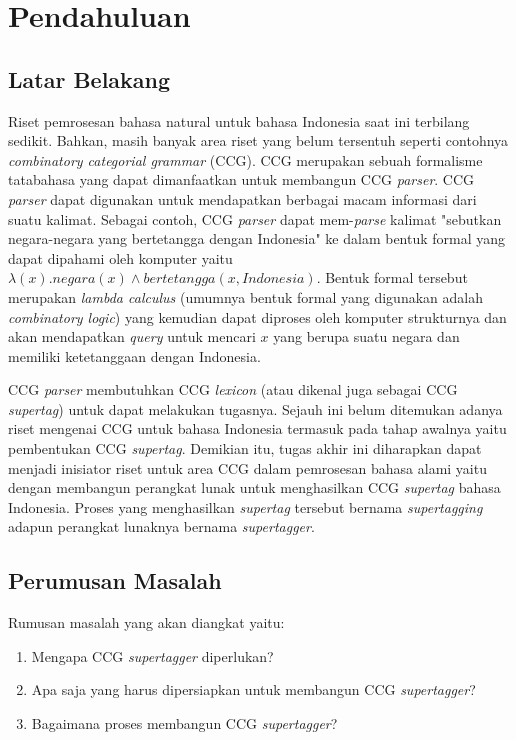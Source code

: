 \chapter{Pendahuluan}
\section{Latar Belakang}

Riset pemrosesan bahasa natural untuk bahasa Indonesia saat ini terbilang sedikit.
Bahkan, masih banyak area riset yang belum tersentuh seperti contohnya
\textit{combinatory categorial grammar} (CCG).
CCG merupakan sebuah formalisme tatabahasa yang dapat dimanfaatkan untuk membangun CCG \textit{parser}.
CCG \textit{parser} dapat digunakan untuk mendapatkan berbagai macam informasi dari suatu kalimat.
Sebagai contoh, CCG \textit{parser} dapat mem-\textit{parse} kalimat
"sebutkan negara-negara yang bertetangga dengan Indonesia" ke dalam bentuk formal yang dapat dipahami
oleh komputer yaitu $\lambda{(x). negara(x) \land bertetangga(x, Indonesia)}$.
Bentuk formal tersebut merupakan \textit{lambda calculus}
(umumnya bentuk formal yang digunakan adalah \textit{combinatory logic}) yang kemudian dapat diproses
oleh komputer strukturnya dan akan mendapatkan \textit{query} untuk mencari $x$ yang berupa
suatu negara dan memiliki ketetanggaan dengan Indonesia.

CCG \textit{parser} membutuhkan CCG \textit{lexicon} (atau dikenal juga sebagai CCG \textit{supertag})
untuk dapat melakukan tugasnya. Sejauh ini belum ditemukan adanya riset mengenai CCG untuk
bahasa Indonesia termasuk pada tahap awalnya yaitu pembentukan CCG \textit{supertag}.
Demikian itu, tugas akhir ini diharapkan dapat menjadi inisiator riset untuk area CCG dalam
pemrosesan bahasa alami yaitu dengan membangun perangkat lunak untuk menghasilkan CCG \textit{supertag}
bahasa Indonesia. Proses yang menghasilkan \textit{supertag} tersebut bernama \textit{supertagging}
adapun perangkat lunaknya bernama \textit{supertagger}.

\section{Perumusan Masalah}
Rumusan masalah yang akan diangkat yaitu:
\begin{enumerate}
    \item Mengapa CCG \textit{supertagger} diperlukan?
    \item Apa saja yang harus dipersiapkan untuk membangun CCG \textit{supertagger}?
    \item Bagaimana proses membangun CCG \textit{supertagger}?
\end{enumerate}
